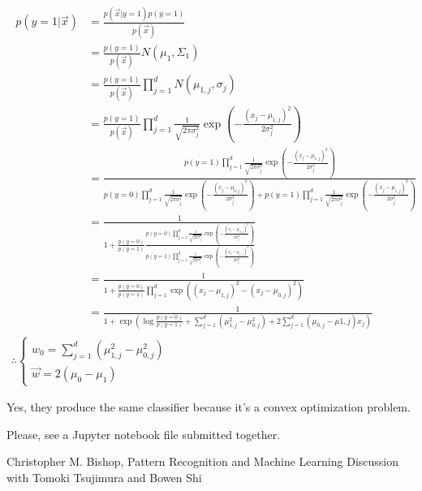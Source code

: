 \documentclass{introtosml}
\newcommand{\x}{\vec{x}}
\newcommand{\w}{\vec{w}}
\newcommand\expp[1]{\exp\left(#1\right)}
\newcommand\gauss[1]{\prod_{j=1}^d \frac{1}{\sqrt{2 \pi \sigma_j^2}} \expp{- \frac{(x_j - \mu_{#1,j})^2}{2 \sigma_j^2}}}
\newcommand\cgauss[1]{p(y=#1)\gauss{#1}}
\newcommand\pbias{\frac{p(y=0)}{p(y=1)}}
\begin{document}
\maketitle

\begin{p}
  \item
    \begin{gather}
      \begin{aligned}
        p(y=1|\x)
        & = \frac{p(\x|y=1)p(y=1)}{p(\x)} \\
        & = \frac{p(y=1)}{p(\x)} N(\mu_1, \Sigma_1) \\
        & = \frac{p(y=1)}{p(\x)} \prod_{j=1}^d N(\mu_{1,j}, \sigma_j) \\
        & = \frac{p(y=1)}{p(\x)} \gauss{1} \\
        & = \frac{\cgauss{1}}{\cgauss{0} + \cgauss{1}} \\
        & = \frac{1}{1 + \pbias \frac{\cgauss{0}}{\cgauss{1}}} \\
        & = \frac{1}{1 + \pbias \prod_{j=1}^d \expp{(x_j - \mu_{1,j})^2 - (x_j - \mu_{0,j})^2}} \\
        & = \frac{1}{1 +
            \expp{\log \pbias + \sum_{j=1}^d (\mu_{1,j}^2 - \mu_{0,j}^2)
            + 2 \sum_{j=1}^d (\mu_{0,j} - \mu{1,j}) x_j}}
      \end{aligned} \\
      \therefore \begin{cases}
        w_0 = \sum_{j=1}^d (\mu_{1,j}^2 - \mu_{0,j}^2) \\
        \w = 2 (\mu_0 - \mu_1)
      \end{cases}
    \end{gather}

  \item
    Yes, they produce the same classifier because it's a convex optimization problem.

  \item
    Please, see a Jupyter notebook file submitted together.
\end{p}

\begin{thebibliography}{9}
   Christopher M. Bishop, Pattern Recognition and Machine Learning
   Discussion with Tomoki Tsujimura and Bowen Shi
\end{thebibliography}
\end{document}
